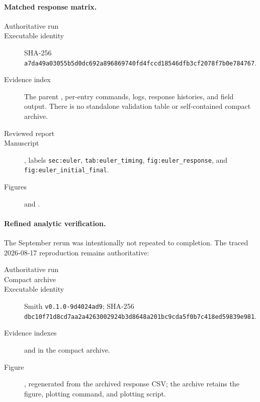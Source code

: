 \documentclass[11pt]{article}
\newcommand{\sha}[2]{\texttt{#1}\allowbreak\texttt{#2}}
\begin{document}
\paragraph{Matched response matrix.}
\begin{description}
  \item[Authoritative run] 
  \item[Executable identity] SHA-256 \sha{a7da49a03055b5d0dc692a896869740f}{d4fccd18546dfb3cf2078f7b0e784767}.
  \item[Evidence index] The parent , per-entry commands, logs, response histories, and field output.  There is no standalone validation table or self-contained compact archive.
  \item[Reviewed report] 
  \item[Manuscript] , labels \texttt{sec:euler}, \texttt{tab:euler\_timing}, \texttt{fig:euler\_response}, and \texttt{fig:euler\_initial\_final}.
  \item[Figures]  and .
\end{description}

\paragraph{Refined analytic verification.}
The September rerun was intentionally not repeated to completion.  The traced
2026-08-17 reproduction remains authoritative:
\begin{description}
  \item[Authoritative run] 
  \item[Compact archive] 
  \item[Executable identity] Smith \texttt{v0.1.0-9d4024ad9}; SHA-256 \sha{dbc10f71d8cd7aa2a4263002924b3d86}{48a201bc9cda5f0b7c418ed59839e981}.
  \item[Evidence indexes]  and  in the compact archive.
  \item[Figure] , regenerated from the archived response CSV; the archive retains the figure, plotting command, and plotting script.
\end{description}
\end{document}

